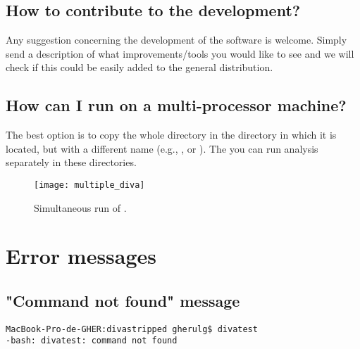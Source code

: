 %
%

\subsection{How to contribute to the development?}

Any suggestion concerning the development of the software is welcome. Simply send a description of what improvements/tools you would like to see and we will check if this could be easily added to the general distribution.


\subsection{How can I run \diva on a multi-processor machine?}

The best option is to copy the whole directory  in the directory in which it is located, but with a different name (e.g.,  , or ). The you can run \diva analysis separately in these directories. 


\begin{figure}[htpb]
\centering
\texttt{[image: multiple\_diva]}
\caption{Simultaneous run of \diva.}
\end{figure}


\section{Error messages}



\subsection{"Command not found" message}

\begin{lstlisting}[style=Bash]
MacBook-Pro-de-GHER:divastripped gherulg$ divatest
-bash: divatest: command not found
\end{lstlisting}

